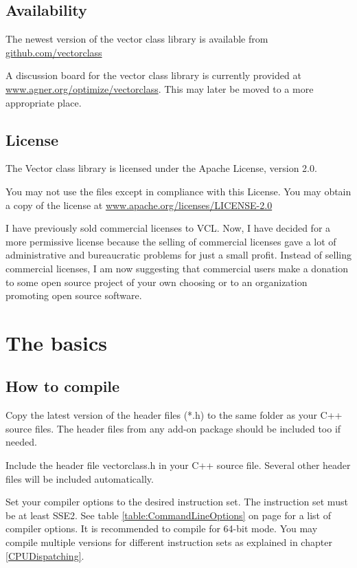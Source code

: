 \documentclass[vcl_manual.tex]{subfiles}
\begin{document}
\section{Availability} \label{Availability}
The newest version of the vector class library is available from 
\href{https://github.com/vectorclass}{github.com/vectorclass}

A discussion board for the vector class library is currently provided at
\href{https://www.agner.org/optimize/vectorclass/}{www.agner.org/optimize/vectorclass}. 
This may later be moved to a more appropriate place.


\section{License} \label{License}
The Vector class library is licensed under the Apache License, version 2.0.

You may not use the files except in compliance with this License.
You may obtain a copy of the license at
\href{https://www.apache.org/licenses/LICENSE-2.0}{www.apache.org/licenses/LICENSE-2.0}

I have previously sold commercial licenses to VCL. Now, I have decided for a more permissive license because the selling of commercial licenses gave a lot of administrative and bureaucratic problems for just a small profit. Instead of selling commercial licenses, I am now suggesting that commercial users make a donation to some open source project of your own choosing or to an organization promoting open source software.


\chapter{The basics}\label{chap:TheBasics}
\section{How to compile} \label{HowToCompile}

Copy the latest version of the header files (*.h) to the same folder as your C++ source files. The header files from any add-on package should be included too if needed.

Include the header file vectorclass.h in your C++ source file.
Several other header files will be included automatically.

Set your compiler options to the desired instruction set. The instruction set must be at least SSE2. See table \ref{table:CommandLineOptions} on page \pageref{table:CommandLineOptions} for a list of compiler options. It is recommended to compile for 64-bit mode.
You may compile multiple versions for different instruction sets as explained in chapter \ref{CPUDispatching}.
\end{document}
